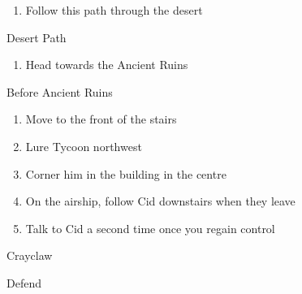 \begin{paracol}{2}
\switchcolumn*
\begin{enumerate}
    \item Follow this path through the desert
\end{enumerate}

\switchcolumn
\begin{misc}{Desert Path}
\end{misc}

\switchcolumn*
\resume
\begin{enumerate}[resume]
    \item Head towards the Ancient Ruins
\end{enumerate}

\switchcolumn
\begin{steproute}{Before Ancient Ruins}
\end{steproute}

\switchcolumn
\resume
\begin{enumerate}[resume]
    \item Move to the front of the stairs
    \item Lure Tycoon northwest
    \item Corner him in the building in the centre
    \item On the airship, follow Cid downstairs when they leave
    \item Talk to Cid a second time once you regain control
\end{enumerate}

\begin{boss}{Crayclaw}
    \varwb
    \begin{round}{1}
        \faris \leftCommand{\throw} \then \thunderScroll
        \bartz Defend
        \lenna \leftCommand{\release}
    \end{round}
    \varwe
\end{boss}

\end{paracol}